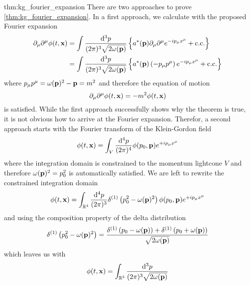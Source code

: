 \begin{delayedproof}{thm:kg_fourier_expansion}
	There are two approaches to prove \cref{thm:kg_fourier_expansion}.
	In a first approach, we calculate with the proposed Fourier expansion
	\begin{equation*}
		\begin{split}
			\partial_\mu
			\partial^\mu
			\phi(t,\vb{x})
			&=
			\int\frac{\dd[3]{p}}{(2\pi)^3\sqrt{2\omega(\vb{p})}}
			\left\{
				a^*(\vb{p})
				\partial_\mu
				\partial^\mu
				e^{-ip_\mu x^\mu}
				+
				\text{c.c.}
			\right\}
			\\
			&=
			\int\frac{\dd[3]{p}}{(2\pi)^3\sqrt{2\omega(\vb{p})}}
			\left\{
				a^*(\vb{p})
				\left(
					-
					p_\mu
					p^\mu
				\right)
				e^{-ip_\mu x^\mu}
				+
				\text{c.c.}
			\right\}
		\end{split}
	\end{equation*}
	where $p_\mu p^\mu=\omega(\vb{p})^2-\vb{p}=m^2$ and therefore the equation of motion
	\begin{equation*}
			\partial_\mu
			\partial^\mu
			\phi(t,\vb{x})
			=
			-
			m^2
			\phi(t,\vb{x})
	\end{equation*}
	is satisfied.
	While the first approach successfully shows why the theorem is true, it is not obvious how to arrive at the Fourier expansion.
	Therefor, a second approach starts with the Fourier transform of the Klein-Gordon field
	\begin{equation*}
		\phi(t,\vb{x})
		=
		\int_V\frac{\dd[4]{p}}{(2\pi)^4}
		\phi(p_0,\vb{p})
		e^{+ip_\mu x^\mu}
	\end{equation*}
	where the integration domain is constrained to the momentum lightcone $V$ and therefore $\omega(\vb{p})^2=p_0^2$ is automatically satisfied.
	We are left to rewrite the constrained integration domain
	\begin{equation*}
		\phi(t,\vb{x})
		=
		\int_{\mathbb{R}^4}\frac{\dd[4]{p}}{(2\pi)^3}
		\delta^{(1)}\left(p_0^2-\omega(\vb{p})^2\right)
		\phi(p_0,\vb{p})
		e^{+ip_\mu x^\mu}
	\end{equation*}
	and using the composition property of the delta distribution
	\begin{equation*}
		\delta^{(1)}\left(p_0^2-\omega(\vb{p})^2\right)
		=
		\frac{
			\delta^{(1)}\left(p_0-\omega(\vb{p})\right)
			+
			\delta^{(1)}\left(p_0+\omega(\vb{p})\right)
		}{\sqrt{2\omega(\vb{p})}}
	\end{equation*}
	which leaves us with
	\begin{equation*}
		\phi(t,\vb{x})
		=
		\int_{\mathbb{R}^3}\frac{\dd[3]{p}}{(2\pi)^3\sqrt{2\omega(\vb{p})}}

\end{equation*}
\end{delayedproof}
